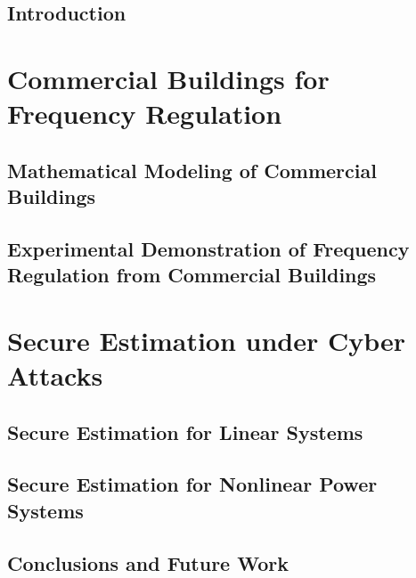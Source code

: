 \documentclass[12pt, oneside, final]{lib/ucthesis}
\def\ssp{\def\baselinestretch{1.0}\large\normalsize}
\begin{document}



\begin{dissertationText}
\chapter{Introduction \label{chapter:intro}}
	
	
\part{Commercial Buildings for Frequency Regulation}\label{part:fr}
\chapter{Mathematical Modeling of Commercial Buildings \label{chapter:building_model}}
	
\chapter{Experimental Demonstration of Frequency Regulation from Commercial Buildings \label{chapter:building_exp}}
	

\part{Secure Estimation under Cyber Attacks}\label{part:se}
\chapter{Secure Estimation for Linear Systems \label{chapter:se_linear}}
	
\chapter{Secure Estimation for Nonlinear Power Systems \label{chapter:se_nonlinear}}
	
	
\chapter{Conclusions and Future Work \label{chapter:conclusions}}
  



\ssp	%




%	

\end{dissertationText}
\end{document}
